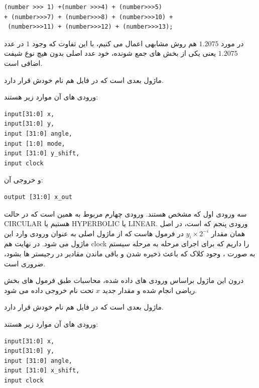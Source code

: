 \documentclass[12pt,titlepage,a4page , tikz , multi,table , svgnames,xcdraw]{article}
\begin{document}
\begin{latin}
\begin{verbatim}
(number >>> 1) +(number >>>4) + (number>>>5)
+ (number>>>7) + (number>>>8) + (number>>>10) +
 (number>>>11) + (number>>>12) + (number>>>13);
\end{verbatim}
\end{latin}

در مورد $1.2075$ هم روش مشابهی اعمال می کنیم، با این تفاوت که وجود $1$ در عدد $1.2075$ یعنی یکی از بخش های جمع شونده، خود عدد اصلی بدون هیچ نوع شیفت اضافی است.

\hrulefill

ماژول بعدی  است که در فایل هم نام خودش قرار دارد.

 
 ورودی های آن موارد زیر هستند:

\begin{latin}
\begin{verbatim}
input[31:0] x,
input[31:0] y,
input [31:0] angle,
input [1:0] mode,
input [31:0] y_shift,
input clock
\end{verbatim}
\end{latin}

و خروجی آن:

\begin{latin}
\begin{verbatim}
output [31:0] x_out
\end{verbatim}
\end{latin}

سه ورودی اول که مشخص هستند. ورودی چهارم مربوط به همین است که در حالت CIRCULAR هستیم یا HYPERBOLIC یا LINEAR. ورودی پنجم که  است، در اصل همان مقدار $y_i \times 2^{-i}$ در فرمول هاست که از ماژول اصلی به عنوان ورودی وارد این ماژول می شود. در نهایت هم clock را داریم که برای اجرای مرحله به مرحله سیستم به صورت ، وجود کلاک که باعث ذخیره شدن و باقی ماندن مقادیر در رجیستر ها بشود، ضروری است.

درون این ماژول براساس ورودی های داده شده، محاسبات طبق فرمول های بخش ریاضی انجام شده و مقدار جدید $x$ تحت نام  خروجی داده می شود.

\hrulefill
 

ماژول بعدی  است که در فایل هم نام خودش قرار دارد.

 
 ورودی های آن موارد زیر هستند:

\begin{latin}
\begin{verbatim}
input[31:0] x,
input[31:0] y,
input [31:0] angle,
input [31:0] x_shift,
input clock
\end{verbatim}
\end{latin}
\end{document}
